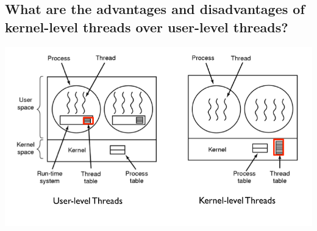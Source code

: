 \documentclass[a4paper]{article}
\begin{document}
\subsection{What are the advantages and disadvantages of kernel-level threads over user-level threads?} %
\label{sub:What are the advantages and disadvantages of kernel-level threads over user-level threads?}
\includegraphics[scale=.43]{usr-vs-kernel.png}
\end{document}
